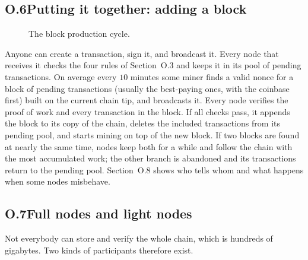 \documentclass[11pt,a4paper]{article}
\theoremstyle{definition}
\theoremstyle{plain}
\theoremstyle{remark}
\begin{document}
\subsection*{O.6\quad Putting it together: adding a block}
\begin{figure}[htbp]
\centering
{}
\caption{The block production cycle.}
\end{figure}
Anyone can create a transaction, sign it, and broadcast it. Every node that receives it checks the four rules of Section~O.3 and keeps it in its pool of pending transactions. On average every $10$ minutes some miner finds a valid nonce for a block of pending transactions (usually the best-paying ones, with the coinbase first) built on the current chain tip, and broadcasts it. Every node verifies the proof of work and every transaction in the block. If all checks pass, it appends the block to its copy of the chain, deletes the included transactions from its pending pool, and starts mining on top of the new block. If two blocks are found at nearly the same time, nodes keep both for a while and follow the chain with the most accumulated work; the other branch is abandoned and its transactions return to the pending pool. Section~O.8 shows who tells whom and what happens when some nodes misbehave.

\subsection*{O.7\quad Full nodes and light nodes}
Not everybody can store and verify the whole chain, which is hundreds of gigabytes. Two kinds of participants therefore exist.
\end{document}
